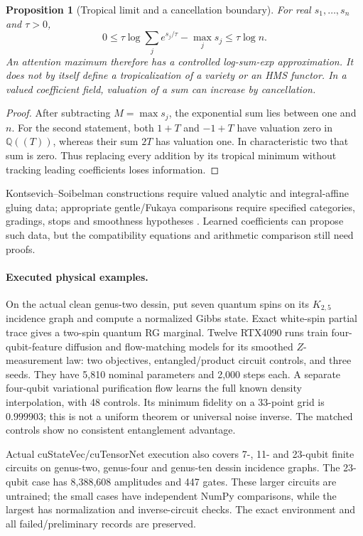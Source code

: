 \documentclass[11pt,oneside,openany]{book}
\newtheorem{proposition}[theorem]{Proposition}
\theoremstyle{definition}\newtheorem{definition}[theorem]{Definition}
\theoremstyle{remark}\newtheorem{remark}[theorem]{Remark}
\begin{document}
\begin{proposition}[Tropical limit and a cancellation boundary]\label{lf:tropical}
For real $s_1,\ldots,s_n$ and $\tau>0$,
\[
 0\leq\tau\log\sum_j e^{s_j/\tau}-\max_j s_j\leq\tau\log n.
\]
An attention maximum therefore has a controlled log-sum-exp approximation.
It does not by itself define a tropicalization of a variety or an HMS functor.
In a valued coefficient field, valuation of a sum can increase by cancellation.
\end{proposition}
\begin{proof}
After subtracting $M=\max s_j$, the exponential sum lies between one and $n$.
For the second statement, both $1+T$ and $-1+T$ have valuation zero in
$\mathbb Q((T))$, whereas their sum $2T$ has valuation one. In characteristic
two that sum is zero. Thus replacing every addition by its tropical minimum
without tracking leading coefficients loses information.
\end{proof}
Kontsevich--Soibelman constructions require valued analytic and
integral-affine gluing data; appropriate gentle/Fukaya comparisons require
specified categories, gradings, stops and smoothness hypotheses
\cite{LFAffine,LFQNTK,LFFukaya}. Learned coefficients can propose such data,
but the compatibility equations and arithmetic comparison still need proofs.

\paragraph{Executed physical examples.}
On the actual clean genus-two dessin, put seven quantum spins on its
$K_{2,5}$ incidence graph and compute a normalized Gibbs state. Exact white-spin
partial trace gives a two-spin quantum RG marginal. Twelve RTX4090 runs train
four-qubit-feature diffusion and flow-matching models for its smoothed
$Z$-measurement law: two objectives, entangled/product circuit controls, and
three seeds. They have 5,810 nominal parameters and 2,000 steps each.
A separate four-qubit variational purification flow learns the full known
density interpolation, with 48 controls. Its minimum fidelity on a 33-point
grid is $0.999903$; this is not a uniform theorem or universal noise inverse.
The matched controls show no consistent entanglement advantage.

Actual cuStateVec/cuTensorNet execution also covers 7-, 11- and 23-qubit
finite circuits on genus-two, genus-four and genus-ten dessin incidence
graphs. The 23-qubit case has 8,388,608 amplitudes and 447 gates. These larger
circuits are untrained; the small cases have independent NumPy comparisons,
while the largest has normalization and inverse-circuit checks.
The exact environment and all failed/preliminary records are preserved.
\end{document}
